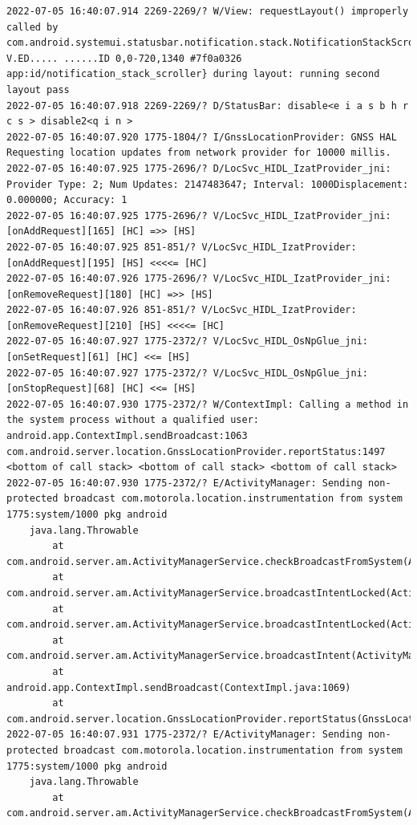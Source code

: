 \documentclass[a4paper,12pt]{book}
\begin{document}
\begin{lstlisting}
2022-07-05 16:40:07.914 2269-2269/? W/View: requestLayout() improperly called by com.android.systemui.statusbar.notification.stack.NotificationStackScrollLayout{cc84c7f V.ED..... ......ID 0,0-720,1340 #7f0a0326 app:id/notification_stack_scroller} during layout: running second layout pass
2022-07-05 16:40:07.918 2269-2269/? D/StatusBar: disable<e i a s b h r c s > disable2<q i n >
2022-07-05 16:40:07.920 1775-1804/? I/GnssLocationProvider: GNSS HAL Requesting location updates from network provider for 10000 millis.
2022-07-05 16:40:07.925 1775-2696/? D/LocSvc_HIDL_IzatProvider_jni: Provider Type: 2; Num Updates: 2147483647; Interval: 1000Displacement: 0.000000; Accuracy: 1
2022-07-05 16:40:07.925 1775-2696/? V/LocSvc_HIDL_IzatProvider_jni: [onAddRequest][165] [HC] =>> [HS]
2022-07-05 16:40:07.925 851-851/? V/LocSvc_HIDL_IzatProvider: [onAddRequest][195] [HS] <<<<= [HC]
2022-07-05 16:40:07.926 1775-2696/? V/LocSvc_HIDL_IzatProvider_jni: [onRemoveRequest][180] [HC] =>> [HS]
2022-07-05 16:40:07.926 851-851/? V/LocSvc_HIDL_IzatProvider: [onRemoveRequest][210] [HS] <<<<= [HC]
2022-07-05 16:40:07.927 1775-2372/? V/LocSvc_HIDL_OsNpGlue_jni: [onSetRequest][61] [HC] <<= [HS]
2022-07-05 16:40:07.927 1775-2372/? V/LocSvc_HIDL_OsNpGlue_jni: [onStopRequest][68] [HC] <<= [HS]
2022-07-05 16:40:07.930 1775-2372/? W/ContextImpl: Calling a method in the system process without a qualified user: android.app.ContextImpl.sendBroadcast:1063 com.android.server.location.GnssLocationProvider.reportStatus:1497 <bottom of call stack> <bottom of call stack> <bottom of call stack> 
2022-07-05 16:40:07.930 1775-2372/? E/ActivityManager: Sending non-protected broadcast com.motorola.location.instrumentation from system 1775:system/1000 pkg android
    java.lang.Throwable
        at com.android.server.am.ActivityManagerService.checkBroadcastFromSystem(ActivityManagerService.java:15425)
        at com.android.server.am.ActivityManagerService.broadcastIntentLocked(ActivityManagerService.java:15979)
        at com.android.server.am.ActivityManagerService.broadcastIntentLocked(ActivityManagerService.java:15442)
        at com.android.server.am.ActivityManagerService.broadcastIntent(ActivityManagerService.java:16227)
        at android.app.ContextImpl.sendBroadcast(ContextImpl.java:1069)
        at com.android.server.location.GnssLocationProvider.reportStatus(GnssLocationProvider.java:1497)
2022-07-05 16:40:07.931 1775-2372/? E/ActivityManager: Sending non-protected broadcast com.motorola.location.instrumentation from system 1775:system/1000 pkg android
    java.lang.Throwable
        at com.android.server.am.ActivityManagerService.checkBroadcastFromSystem(ActivityManagerService.java:15425)

\end{lstlisting}
\end{document}
